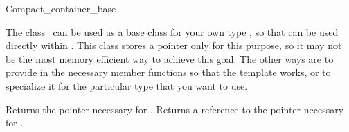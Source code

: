 

\begin{ccRefClass}{Compact_container_base}

  \ccDefinition The class \ccRefName\ can be used as a base class for
  your own type , so that  can be used directly within
  .  This class stores a 
  pointer only for this purpose, so it may not be the most memory efficient
  way to achieve this goal.  The other ways are to provide in  the
  necessary member functions so that the template
   works, or to specialize it for the
  particular type  that you want to use.

  \ccTagFullDeclarations

  \ccOperations

  { Returns the pointer necessary for . }
  \ccGlue
  { Returns a reference to the pointer necessary for
    . }
\end{ccRefClass}

